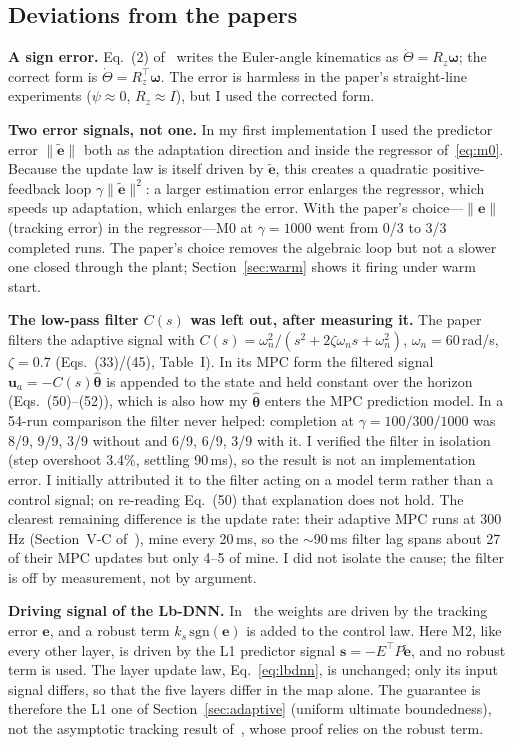 \documentclass[conference]{IEEEtran}
\newcommand{\thetahat}{\hat{\bm\theta}}
\newcommand{\etilde}{\tilde{\bm e}}
\begin{document}
\subsection{Deviations from the papers}\label{sec:deviations}
\textbf{A sign error.} Eq.~(2) of~\cite{sombolestan2024} writes the
Euler-angle kinematics as $\dot\Theta=R_z\bm\omega$; the correct form is
$\dot\Theta=R_z^\top\bm\omega$. The error is harmless in the paper's
straight-line experiments ($\psi\approx0$, $R_z\approx I$), but I used
the corrected form.

\textbf{Two error signals, not one.} In my first implementation I used
the predictor error $\|\etilde\|$ both as the adaptation direction and
inside the regressor of~\eqref{eq:m0}. Because the update law is itself
driven by $\etilde$, this creates a quadratic positive-feedback loop
$\gamma\|\etilde\|^2$: a larger estimation error enlarges the regressor,
which speeds up adaptation, which enlarges the error. With the paper's
choice---$\|\bm e\|$ (tracking error) in the regressor---M0 at
$\gamma=1000$ went from 0/3 to 3/3 completed runs. The paper's choice
removes the algebraic loop but not a slower one closed through the
plant; Section~\ref{sec:warm} shows it firing under warm start.

\textbf{The low-pass filter $C(s)$ was left out, after measuring it.}
The paper filters the adaptive signal with
$C(s)=\omega_n^2/(s^2+2\zeta\omega_n s+\omega_n^2)$,
$\omega_n=60$\,rad/s, $\zeta=0.7$ (Eqs.~(33)/(45), Table~I). In its MPC
form the filtered signal $\bm u_a=-C(s)\thetahat$ is appended to the
state and held constant over the horizon (Eqs.~(50)--(52)), which is
also how my $\thetahat$ enters the MPC prediction model. In a 54-run
comparison the filter never helped: completion at $\gamma=100/300/1000$
was 8/9, 9/9, 3/9 without and 6/9, 6/9, 3/9 with it. I verified the
filter in isolation (step overshoot 3.4\%, settling 90\,ms), so the
result is not an implementation error. I initially attributed it to the
filter acting on a model term rather than a control signal; on re-reading
Eq.~(50) that explanation does not hold. The clearest remaining
difference is the update rate: their adaptive MPC runs at 300\,Hz
(Section~V-C of~\cite{sombolestan2024}), mine every 20\,ms, so the
$\sim$90\,ms filter lag spans about 27 of their MPC updates but only
4--5 of mine. I did not isolate the cause; the filter is off by
measurement, not by argument.

\textbf{Driving signal of the Lb-DNN.} In~\cite{patil2022} the weights
are driven by the tracking error $\bm e$, and a robust term
$k_s\,\mathrm{sgn}(\bm e)$ is added to the control law. Here M2, like
every other layer, is driven by the L1 predictor signal
$\bm s=-E^\top P\etilde$, and no robust term is used. The layer update
law, Eq.~\eqref{eq:lbdnn}, is unchanged; only its input signal differs,
so that the five layers differ in the map alone. The guarantee is
therefore the L1 one of Section~\ref{sec:adaptive} (uniform ultimate
boundedness),
not the asymptotic tracking result of~\cite{patil2022}, whose proof
relies on the robust term.
\end{document}
